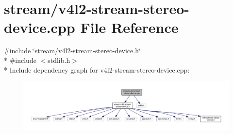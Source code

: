 \hypertarget{v4l2-stream-stereo-device_8cpp}{}\section{stream/v4l2-\/stream-\/stereo-\/device.cpp File Reference}
\label{v4l2-stream-stereo-device_8cpp}
{\ttfamily \#include \char`\"{}stream/v4l2-\/stream-\/stereo-\/device.\+h\char`\"{}}\\*
{\ttfamily \#include $<$stdlib.\+h$>$}\\*
Include dependency graph for v4l2-\/stream-\/stereo-\/device.cpp\+:
\nopagebreak
\begin{figure}[H]
\begin{center}
\leavevmode
\includegraphics[width=350pt]{v4l2-stream-stereo-device_8cpp__incl}
\end{center}
\end{figure}
